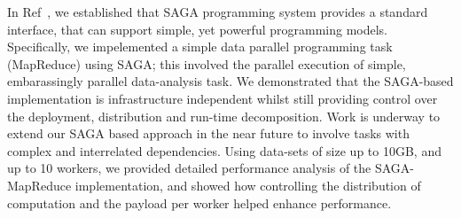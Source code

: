 \documentclass[conference,final]{IEEEtran}
\begin{document}

In Ref~\cite{saga_ccgrid09}, we established that SAGA programming
system provides a standard interface, %
that can support simple, yet powerful programming models.
Specifically, we impelemented a simple data parallel programming task
(MapReduce) using SAGA; this involved the parallel execution of
simple, embarassingly parallel data-analysis task.  We demonstrated
that the SAGA-based implementation is infrastructure independent
whilst still providing control over the deployment, distribution and
run-time decomposition.  Work is underway to extend our SAGA based
approach in the near future to involve tasks with complex and
interrelated dependencies.  Using data-sets of size up to 10GB, and up
to 10 workers, we provided detailed performance analysis of the
SAGA-MapReduce implementation, and showed how controlling the
distribution of computation and the payload per worker helped enhance
performance.



\end{document}
